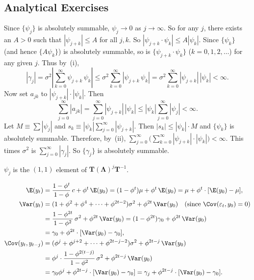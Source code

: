 \begin{answers}

\subsection*{Analytical Exercises}

 Since $\{\psi_j\}$ is absolutely summable, $\psi_j \to 0$ as $j \to \infty$. So for any $j$, there
exists an $A > 0$ such that $|\psi_{j+k}| \leq A$ for all $j, k$. So $|\psi_{j+k} \cdot \psi_k| \leq A|\psi_k|$.
Since $\{\psi_k\}$ (and hence $\{A\psi_k\}$) is absolutely summable, so is $\{\psi_{j+k} \cdot \psi_k\}$ ($k =
0, 1, 2, \ldots$) for any given $j$. Thus by~(i),
\[
  |\gamma_j| = \sigma^2 \left|\sum_{k=0}^{\infty} \psi_{j+k}\,\psi_k\right|
  \leq \sigma^2 \sum_{k=0}^{\infty} |\psi_{j+k}\,\psi_k|
  = \sigma^2 \sum_{k=0}^{\infty} |\psi_{j+k}|\,|\psi_k| < \infty.
\]
Now set $a_{jk}$ to $|\psi_{j+k}| \cdot |\psi_k|$. Then
\[
  \sum_{j=0}^{\infty} |a_{jk}| = \sum_{j=0}^{\infty} |\psi_{j+k}|\,|\psi_k|
  \leq |\psi_k| \sum_{j=0}^{\infty} |\psi_j| < \infty.
\]
Let $M \equiv \sum |\psi_j|$ and $s_k \equiv |\psi_k| \sum_{j=0}^{\infty} |\psi_{j+k}|$.
Then $|s_k| \leq |\psi_k| \cdot M$ and $\{\psi_k\}$ is absolutely summable.
Therefore, by~(ii),
$\sum_{j=0}^{\infty}\bigl(\sum_{k=0}^{\infty} |\psi_{j+k}| \cdot |\psi_k|\bigr) < \infty$.
This times $\sigma^2$ is $\sum_{j=0}^{\infty} |\gamma_j|$. So $\{\gamma_j\}$ is absolutely summable.

 $\psi_j$ is the $(1, 1)$ element of $\mathbf{T}(\bm{\Lambda})^j \mathbf{T}^{-1}$.

\begin{align*}
  \E(y_t) &= \frac{1 - \phi^t}{1 - \phi}\,c + \phi^t\,\E(y_0)
  = (1 - \phi^t)\mu + \phi^t\,\E(y_0)
  = \mu + \phi^t \cdot [\E(y_0) - \mu], \\
  \Var(y_t) &= (1 + \phi^2 + \phi^4 + \cdots + \phi^{2t-2})\sigma^2 + \phi^{2t}\,\Var(y_0)
  \quad (\text{since } \Cov(\varepsilon_t, y_0) = 0) \\
  &= \frac{1 - \phi^{2t}}{1 - \phi^2}\,\sigma^2 + \phi^{2t}\,\Var(y_0)
  = (1 - \phi^{2t})\gamma_0 + \phi^{2t}\,\Var(y_0) \\
  &= \gamma_0 + \phi^{2t} \cdot [\Var(y_0) - \gamma_0], \\
  \Cov(y_t, y_{t-j}) &= (\phi^j + \phi^{j+2} + \cdots + \phi^{2t-j-2})\sigma^2 + \phi^{2t-j}\,\Var(y_0) \\
  &= \phi^j \cdot \frac{1 - \phi^{2(t-j)}}{1 - \phi^2}\,\sigma^2 + \phi^{2t-j}\,\Var(y_0) \\
  &= \gamma_0 \phi^j + \phi^{2t-j} \cdot [\Var(y_0) - \gamma_0]
  = \gamma_j + \phi^{2t-j} \cdot [\Var(y_0) - \gamma_0].
\end{align*}


\end{answers}
